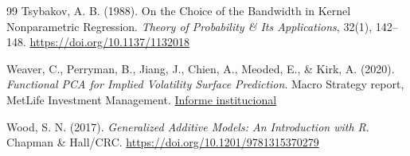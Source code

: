 \documentclass[a4paper,11pt]{article}
\begin{document}
\begin{thebibliography}{99}
Tsybakov, A. B. (1988). On the Choice of the Bandwidth in Kernel Nonparametric Regression. \emph{Theory of Probability \& Its Applications}, 32(1), 142--148. \url{https://doi.org/10.1137/1132018}

Weaver, C., Perryman, B., Jiang, J., Chien, A., Meoded, E., \& Kirk, A. (2020). \emph{Functional PCA for Implied Volatility Surface Prediction}. Macro Strategy report, MetLife Investment Management. \href{https://investments.metlife.com/content/dam/metlifecom/us/investments/insights/research-topics/macro-strategy/pdf/MIM_Functional-PCA-Implied-Volatility-Surface-Prediction_051920.pdf}{Informe institucional}

Wood, S. N. (2017). \emph{Generalized Additive Models: An Introduction with R}. Chapman \& Hall/CRC. \url{https://doi.org/10.1201/9781315370279}

\end{thebibliography}
\end{document}

